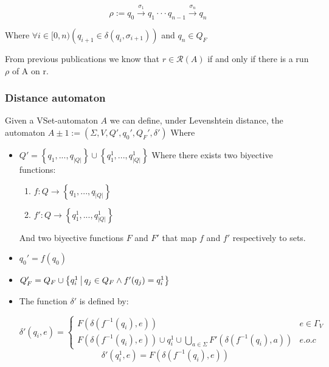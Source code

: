 \documentclass{article}
\newcommand{\abs}[1]{\left|#1\right|}
\newcommand{\set}[1]{\left\{#1\right\}}
\newcommand{\paren}[1]{\left(#1\right)}
\newcommand{\st}{\ \vline \ }
\newcommand{\ra}{\rightarrow}
\newcommand{\lra}{\longrightarrow}
\begin{document}
\begin{equation}
    \rho:=q_0\overset{\sigma_1}{\lra}q_1 \cdot\cdot\cdot q_{n-1} \overset{\sigma_n}{\lra}q_n
\end{equation}

Where $\forall i \in [0,n)\paren{q_{i+1} \in \delta(q_i,\sigma_{i+1})}$ and $q_n\in Q_F$ 

From previous publications we know that $r \in \mathcal{R}(A)$ if and only if there is a run $\rho$ of A on r.

\newpage
\subsubsection*{Distance automaton}

Given a VSet-automaton $A$ we can define, under Levenshtein distance, the automaton $A \pm 1:= (\Sigma, V, Q', q_0', Q_F', \delta')$ Where
\begin{itemize}
    \item $Q' = \set{q_1,...,q_{\abs{Q}}} \cup \set{q^{1}_1, ..., q^{1}_{\abs{Q}}} $ Where there exists two biyective functions:

        \begin{enumerate}
            \item $f: Q \ra \set{q_1,...,q_{\abs{Q}}}$ 
            \item $f' : Q \ra \set{q^{1}_1, ..., q^{1}_{\abs{Q}}}$
        \end{enumerate}

        And two biyective functions $F$ and $F'$ that map $f$ and $f'$ respectively to sets.

    \item $q_0' = f(q_0)$

    \item $Q_F' = Q_F \cup \set{q^1_i \st q_j \in Q_F \land f'(q_j) = q_i^1}$
    \item The function $\delta'$ is defined by:

        \begin{equation*}
        \delta'(q_i, e) = \begin{cases}
            F(\delta(f^{-1}(q_i), e)) & e \in \Gamma_V\\
                            F(\delta(f^{-1}(q_i), e)) \cup q_i^1\cup \underset{a \in \Sigma}{\bigcup} F'(\delta(f^{-1}(q_i), a)) & e.o.c
                          \end{cases}
        \end{equation*}
        \begin{equation*}
            \delta'(q_i^1, e) = F(\delta(f^{-1}(q_i), e))
        \end{equation*}
\end{itemize}
\end{document}
